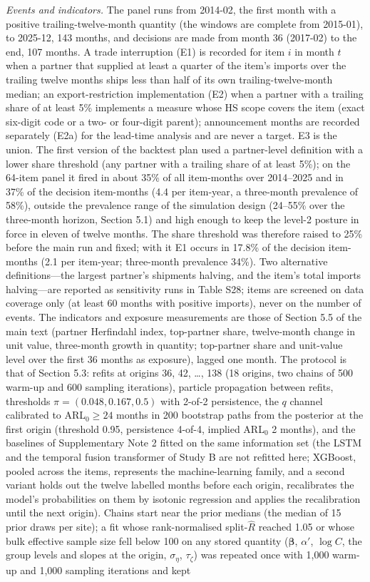 \textit{Events and indicators.} The panel runs from 2014-02, the first month with a positive trailing-twelve-month quantity (the windows are complete from 2015-01), to 2025-12, 143 months, and decisions are made from month 36 (2017-02) to the end, 107 months. A trade interruption (E1) is recorded for item $i$ in month $t$ when a partner that supplied at least a quarter of the item's imports over the trailing twelve months ships less than half of its own trailing-twelve-month median; an export-restriction implementation (E2) when a partner with a trailing share of at least 5\% implements a measure whose HS scope covers the item (exact six-digit code or a two- or four-digit parent); announcement months are recorded separately (E2a) for the lead-time analysis and are never a target. E3 is the union. The first version of the backtest plan used a partner-level definition with a lower share threshold (any partner with a trailing share of at least 5\%); on the 64-item panel it fired in about 35\% of all item-months over 2014--2025 and in 37\% of the decision item-months (4.4 per item-year, a three-month prevalence of 58\%), outside the prevalence range of the simulation design (24--55\% over the three-month horizon, Section 5.1) and high enough to keep the level-2 posture in force in eleven of twelve months. The share threshold was therefore raised to 25\% before the main run and fixed; with it E1 occurs in 17.8\% of the decision item-months (2.1 per item-year; three-month prevalence 34\%). Two alternative definitions---the largest partner's shipments halving, and the item's total imports halving---are reported as sensitivity runs in Table S28; items are screened on data coverage only (at least 60 months with positive imports), never on the number of events. The indicators and exposure measurements are those of Section 5.5 of the main text (partner Herfindahl index, top-partner share, twelve-month change in unit value, three-month growth in quantity; top-partner share and unit-value level over the first 36 months as exposure), lagged one month. The protocol is that of Section 5.3: refits at origins 36, 42, \ldots, 138 (18 origins, two chains of 500 warm-up and 600 sampling iterations), particle propagation between refits, thresholds $\pi = (0.048, 0.167, 0.5)$ with 2-of-2 persistence, the $q$ channel calibrated to ARL$_0 \geq 24$ months in 200 bootstrap paths from the posterior at the first origin (threshold 0.95, persistence 4-of-4, implied ARL$_0$ 2 months), and the baselines of Supplementary Note 2 fitted on the same information set (the LSTM and the temporal fusion transformer of Study B are not refitted here; XGBoost, pooled across the items, represents the machine-learning family, and a second variant holds out the twelve labelled months before each origin, recalibrates the model's probabilities on them by isotonic regression and applies the recalibration until the next origin). Chains start near the prior medians (the median of 15 prior draws per site); a fit whose rank-normalised split-$\widehat{R}$ reached 1.05 or whose bulk effective sample size fell below 100 on any stored quantity ($\boldsymbol{\beta}$, $\alpha'$, $\log C$, the group levels and slopes at the origin, $\sigma_\eta$, $\tau_\zeta$) was repeated once with 1,000 warm-up and 1,000 sampling iterations and kept 